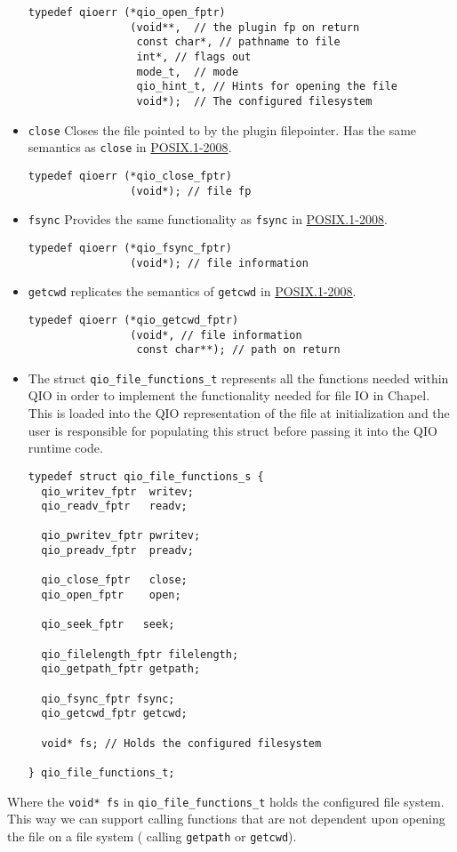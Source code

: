 \begin{itemize}
\begin{lstlisting}
typedef qioerr (*qio_open_fptr)
                (void**,  // the plugin fp on return
                 const char*, // pathname to file
                 int*, // flags out
                 mode_t,  // mode
                 qio_hint_t, // Hints for opening the file
                 void*);  // The configured filesystem
\end{lstlisting}
\item {\tt close} Closes the file pointed to by the plugin filepointer. Has the same
semantics as {\tt close} in
\href{http://pubs.opengroup.org/onlinepubs/9699919799/}{POSIX.1-2008}.
\begin{lstlisting}
typedef qioerr (*qio_close_fptr)
                (void*); // file fp
\end{lstlisting}
\item {\tt fsync} Provides the same functionality as {\tt fsync} in 
\href{http://pubs.opengroup.org/onlinepubs/9699919799/}{POSIX.1-2008}.
\begin{lstlisting}
typedef qioerr (*qio_fsync_fptr)
                (void*); // file information
\end{lstlisting}
\item {\tt getcwd} replicates the semantics of {\tt getcwd} in 
\href{http://pubs.opengroup.org/onlinepubs/9699919799/}{POSIX.1-2008}.
\begin{lstlisting}
typedef qioerr (*qio_getcwd_fptr)
                (void*, // file information
                 const char**); // path on return
\end{lstlisting}
\item The struct {\tt qio\_file\_functions\_t} represents all the functions needed within
QIO in order to implement the functionality needed for file IO in Chapel. This is
loaded into the QIO representation of the file at initialization and the user is
responsible for populating this struct before passing it into the QIO runtime code.
\begin{lstlisting}
typedef struct qio_file_functions_s {
  qio_writev_fptr  writev; 
  qio_readv_fptr   readv;

  qio_pwritev_fptr pwritev;
  qio_preadv_fptr  preadv;

  qio_close_fptr   close;
  qio_open_fptr    open;

  qio_seek_fptr   seek;

  qio_filelength_fptr filelength;
  qio_getpath_fptr getpath;

  qio_fsync_fptr fsync;
  qio_getcwd_fptr getcwd;

  void* fs; // Holds the configured filesystem

} qio_file_functions_t;
\end{lstlisting}
\end{itemize}
Where the {\tt void* fs} in {\tt qio\_file\_functions\_t} holds the configured file system. This way we can support
calling functions that are not dependent upon opening the file on a file system (\eg
calling {\tt getpath} or {\tt getcwd}). 

